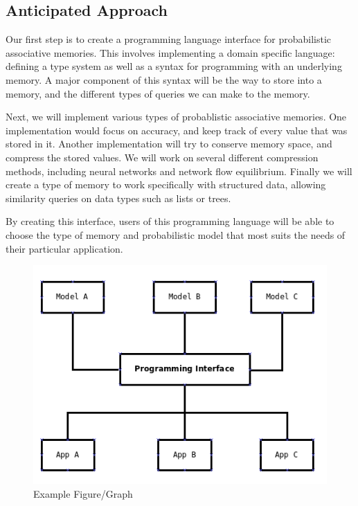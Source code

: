 \documentclass{sig-alternate}
\begin{document}

\subsection{Anticipated Approach}
\label{subsec:approach}

Our first step is to create a programming language interface for probabilistic
associative memories. This involves implementing a domain specific language: 
defining a type system as well as a syntax for programming with an underlying memory.
A major component of this syntax will be the way to store into a memory, 
and the different types of queries we can make to the memory.

Next, we will implement various types of probablistic associative memories.
One implementation would focus on accuracy, and keep track of every value that
was stored in it. Another implementation will try to conserve memory space,
and compress the stored values. We will work on several different compression methods,
including neural networks and network flow equilibrium. Finally we will create
a type of memory to work specifically with structured data, allowing similarity
queries on data types such as lists or trees.

By creating this interface, users of this programming language will be able to
choose the type of memory and probabilistic model that most suits the needs of their particular
application. 

\begin{figure}[H]
	\begin{center}
		\includegraphics[width=0.90\linewidth]{block}
	\end{center}
	\vspace{-12pt}
	\caption{Example Figure/Graph}
	\label{fig:block}
\end{figure}
\end{document}
